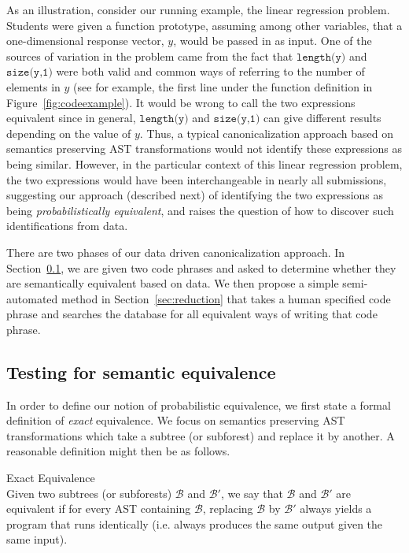 As an illustration, consider our running example, the linear regression problem. 
Students were given a function prototype, assuming among other variables,  
that a one-dimensional response vector, $y$, would be passed in as input.
One of the sources of variation in the  problem came from the fact that
$\texttt{length(y)}$ and $\texttt{size(y,1)}$ were both valid and common ways of referring to the number of
elements in $y$ (see for example, the first line under the function definition in Figure~\ref{fig:codeexample}).  
It would be wrong to call the two expressions equivalent since
in general, $\texttt{length(y)}$ and $\texttt{size(y,1)}$ can give different results depending on the value of $y$.
Thus, a typical canonicalization approach based on semantics preserving AST transformations would not identify these expressions as being similar.
However, in the particular context of this linear regression problem, the two expressions would have been interchangeable
in nearly all submissions, suggesting our approach (described next) of identifying the two expressions as
being \emph{probabilistically equivalent}, and raises the question of how to discover such identifications from data.


There are two phases of our data driven canonicalization approach. In Section~\ref{sec:testing}, we are given 
two code phrases and asked to determine whether they are semantically equivalent based on data.
We then propose a simple semi-automated method in Section~\ref{sec:reduction} that takes a human specified code phrase and searches the database for all equivalent
ways of writing that code phrase.


\subsection{Testing for semantic equivalence}\label{sec:testing}
In order to define our notion of probabilistic equivalence, we first state a formal definition of \emph{exact} equivalence.
We focus on semantics preserving AST transformations which take a subtree (or subforest) and replace it by another.
A reasonable definition might then be as follows. 

\vspace{2mm}
\begin{defo}
Exact Equivalence \\
\label{def:exactequivalence}
Given two subtrees (or subforests) $\mathcal{B}$ and $\mathcal{B}'$,
we say that $\mathcal{B}$ and $\mathcal{B}'$ are equivalent if for every AST containing $\mathcal{B}$,
replacing $\mathcal{B}$ by $\mathcal{B}'$ always
yields a program that runs identically (i.e. always produces the same output given the same input).  
\end{defo}
\vspace{2mm}


